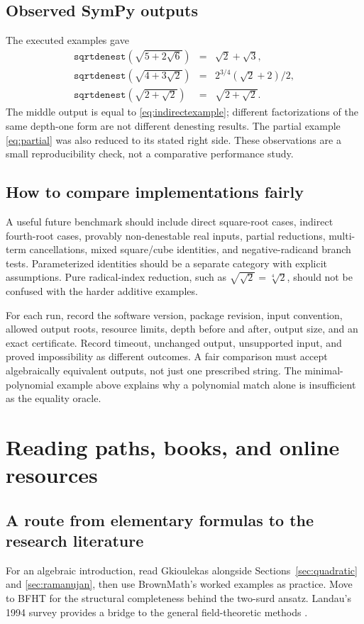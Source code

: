\documentclass[11pt,letterpaper]{article}
\numberwithin{equation}{section}
\theoremstyle{definition}
\theoremstyle{remark}
\begin{document}
\subsection{Observed SymPy outputs}
The executed examples gave
\[
\begin{array}{rcl}
\texttt{sqrtdenest}(\sqrt{5+2\sqrt6})&=&\sqrt2+\sqrt3,\\[3pt]
\texttt{sqrtdenest}(\sqrt{4+3\sqrt2})&=&
2^{3/4}(\sqrt2+2)/2,\\[3pt]
\texttt{sqrtdenest}(\sqrt{2+\sqrt2})&=&\sqrt{2+\sqrt2}.
\end{array}
\]
The middle output is equal to \eqref{eq:indirectexample}; different factorizations of the same depth-one form are not different denesting results. The partial example \eqref{eq:partial} was also reduced to its stated right side. These observations are a small reproducibility check, not a comparative performance study.

\subsection{How to compare implementations fairly}
A useful future benchmark should include direct square-root cases, indirect fourth-root cases, provably non-denestable real inputs, partial reductions, multi-term cancellations, mixed square/cube identities, and negative-radicand branch tests. Parameterized identities should be a separate category with explicit assumptions. Pure radical-index reduction, such as $\sqrt{\sqrt2}=\sqrt[4]2$, should not be confused with the harder additive examples.

For each run, record the software version, package revision, input convention, allowed output roots, resource limits, depth before and after, output size, and an exact certificate. Record timeout, unchanged output, unsupported input, and proved impossibility as different outcomes. A fair comparison must accept algebraically equivalent outputs, not just one prescribed string. The minimal-polynomial example above explains why a polynomial match alone is insufficient as the equality oracle.

\section{Reading paths, books, and online resources}\label{sec:reading}

\subsection{A route from elementary formulas to the research literature}
For an algebraic introduction, read Gkioulekas alongside Sections~\ref{sec:quadratic} and \ref{sec:ramanujan}, then use BrownMath's worked examples as practice. Move to BFHT for the structural completeness behind the two-surd ansatz. Landau's 1994 survey provides a bridge to the general field-theoretic methods \cite{gkioulekas,brownmath,bfht,landau94}.
\end{document}
